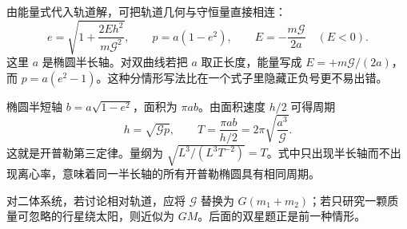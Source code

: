 由能量式代入轨道解，可把轨道几何与守恒量直接相连：
\begin{equation}
 e=\sqrt{1+\frac{2Eh^2}{m\mathcal G^2}},\qquad
 p=a(1-e^2),\qquad
 E=-\frac{m\mathcal G}{2a}\quad(E<0).
 \label{r2ch05:eq:013}
\end{equation}
这里 $a$ 是椭圆半长轴。对双曲线若把 $a$ 取正长度，能量写成 $E=+m\mathcal G/(2a)$，而 $p=a(e^2-1)$。这种分情形写法比在一个式子里隐藏正负号更不易出错。

椭圆半短轴 $b=a\sqrt{1-e^2}$，面积为 $\pi ab$。由面积速度 $h/2$ 可得周期
\begin{equation}
 h=\sqrt{\mathcal Gp},\qquad
 T=\frac{\pi ab}{h/2}=2\pi\sqrt{\frac{a^3}{\mathcal G}}.
 \label{r2ch05:eq:014}
\end{equation}
这就是开普勒第三定律。量纲为 $\sqrt{L^3/(L^3T^{-2})}=T$。式中只出现半长轴而不出现离心率，意味着同一半长轴的所有开普勒椭圆具有相同周期。

对二体系统，若讨论相对轨道，应将 $\mathcal G$ 替换为 $G(m_1+m_2)$；若只研究一颗质量可忽略的行星绕太阳，则近似为 $GM$。后面的双星题正是前一种情形。
